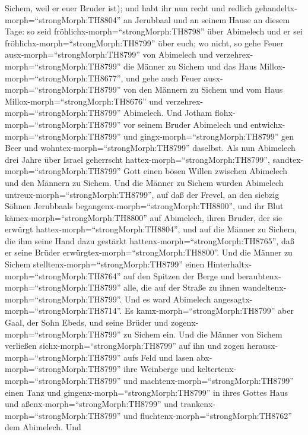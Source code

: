 Sichem, weil er euer Bruder ist);  und habt ihr nun recht
und redlich gehandeltx-morph=``strongMorph:TH8804'' an Jerubbaal und an
seinem Hause an diesem Tage: so seid
fröhlichx-morph=``strongMorph:TH8798'' über Abimelech und er sei
fröhlichx-morph=``strongMorph:TH8799'' über euch;  wo
nicht, so gehe Feuer ausx-morph=``strongMorph:TH8799'' von Abimelech und
verzehrex-morph=``strongMorph:TH8799'' die Männer zu Sichem und das Haus
Millox-morph=``strongMorph:TH8677'', und gehe auch Feuer
ausx-morph=``strongMorph:TH8799'' von den Männern zu Sichem und vom Haus
Millox-morph=``strongMorph:TH8676'' und
verzehrex-morph=``strongMorph:TH8799'' Abimelech.  Und
Jotham flohx-morph=``strongMorph:TH8799'' vor seinem Bruder Abimelech
und entwichx-morph=``strongMorph:TH8799'' und
gingx-morph=``strongMorph:TH8799'' gen Beer und
wohntex-morph=``strongMorph:TH8799'' daselbst.  Als nun
Abimelech drei Jahre über Israel geherrscht
hattex-morph=``strongMorph:TH8799'', 
sandtex-morph=``strongMorph:TH8799'' Gott einen bösen Willen zwischen
Abimelech und den Männern zu Sichem. Und die Männer zu Sichem wurden
Abimelech untreux-morph=``strongMorph:TH8799'',  auf daß
der Frevel, an den siebzig Söhnen Jerubbaals
begangenx-morph=``strongMorph:TH8800'', und ihr Blut
kämex-morph=``strongMorph:TH8800'' auf Abimelech, ihren Bruder, der sie
erwürgt hattex-morph=``strongMorph:TH8804'', und auf die Männer zu
Sichem, die ihm seine Hand dazu gestärkt
hattenx-morph=``strongMorph:TH8765'', daß er seine Brüder
erwürgtex-morph=``strongMorph:TH8800''.  Und die Männer zu
Sichem stelltenx-morph=``strongMorph:TH8799'' einen
Hinterhaltx-morph=``strongMorph:TH8764'' auf den Spitzen der Berge und
beraubtenx-morph=``strongMorph:TH8799'' alle, die auf der Straße zu
ihnen wandeltenx-morph=``strongMorph:TH8799''. Und es ward Abimelech
angesagtx-morph=``strongMorph:TH8714''.  Es
kamx-morph=``strongMorph:TH8799'' aber Gaal, der Sohn Ebeds, und seine
Brüder und zogenx-morph=``strongMorph:TH8799'' zu Sichem ein. Und die
Männer von Sichem verließen sichx-morph=``strongMorph:TH8799'' auf ihn
 und zogen herausx-morph=``strongMorph:TH8799'' aufs Feld
und lasen abx-morph=``strongMorph:TH8799'' ihre Weinberge und
keltertenx-morph=``strongMorph:TH8799'' und
machtenx-morph=``strongMorph:TH8799'' einen Tanz und
gingenx-morph=``strongMorph:TH8799'' in ihres Gottes Haus und
aßenx-morph=``strongMorph:TH8799'' und
trankenx-morph=``strongMorph:TH8799'' und
fluchtenx-morph=``strongMorph:TH8762'' dem Abimelech.  Und
